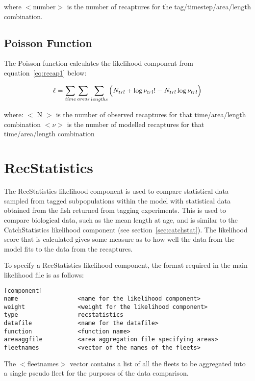 \documentclass[10pt,twoside]{book}
\begin{document}
where $<$number$>$ is the number of recaptures for the tag/timestep/area/length combination.

\subsection{Poisson Function}
The Poisson function calculates the likelihood component from equation~\ref{eq:recap1} below:

\begin{equation}\label{eq:recap1}
\ell = \sum_{\it time}\sum_{\it areas}\sum_{\it lengths} \Big( N_{trl} + \log \nu_{trl}! - N_{trl} \log \nu_{trl} \Big)
\end{equation}

where:\newline
$<$ N $>$ is the number of observed recaptures for that time/area/length combination\newline
$<\nu>$ is the number of modelled recaptures for that time/area/length combination

\section{RecStatistics}\label{sec:recstat}
The RecStatistics likelihood component is used to compare statistical data sampled from tagged subpopulations within the model with statistical data obtained from the fish returned from tagging experiments.  This is used to compare biological data, such as the mean length at age, and is similar to the CatchStatistics likelihood component (see section~\ref{sec:catchstat}).  The likelihood score that is calculated gives some measure as to how well the data from the model fits to the data from the recaptures.

\bigskip
To specify a RecStatistics likelihood component, the format required in the main likelihood file is as follows:

{\small\begin{verbatim}
[component]
name                 <name for the likelihood component>
weight               <weight for the likelihood component>
type                 recstatistics
datafile             <name for the datafile>
function             <function name>
areaaggfile          <area aggregation file specifying areas>
fleetnames           <vector of the names of the fleets>
\end{verbatim}}

The $<$fleetnames$>$ vector contains a list of all the fleets to be aggregated into a single pseudo fleet for the purposes of the data comparison.
\end{document}
